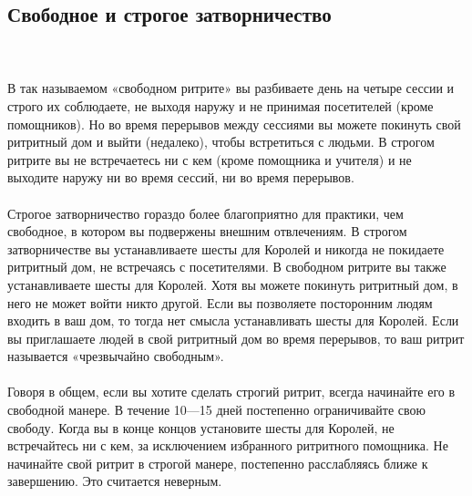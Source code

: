 \subsection{Свободное и строгое затворничество}
\\ \\ В так называемом «свободном ритрите» вы разбиваете день на четыре сессии и строго их соблюдаете, не выходя наружу и не принимая посетителей (кроме помощников). Но во время перерывов между сессиями вы можете покинуть свой ритритный дом и выйти (недалеко), чтобы встретиться с людьми. В строгом ритрите вы не встречаетесь ни с кем (кроме помощника и учителя) и не выходите наружу ни во время сессий, ни во время перерывов.
\\ \\ Строгое затворничество гораздо более благоприятно для практики, чем свободное, в котором вы подвержены внешним отвлечениям. В строгом затворничестве вы устанавливаете шесты для Королей и никогда не покидаете ритритный дом, не встречаясь с посетителями. В свободном ритрите вы также устанавливаете шесты для Королей. Хотя вы можете покинуть ритритный дом, в него не может войти никто другой. Если вы позволяете посторонним людям входить в ваш дом, то тогда нет смысла устанавливать шесты для Королей. Если вы приглашаете людей в свой ритритный дом во время перерывов, то ваш ритрит называется «чрезвычайно свободным».
\\ \\ Говоря в общем, если вы хотите сделать строгий ритрит, всегда начинайте его в свободной манере. В течение 10—15 дней постепенно ограничивайте свою свободу. Когда вы в конце концов установите шесты для Королей, не встречайтесь ни с кем, за исключением избранного ритритного помощника. Не начинайте свой ритрит в строгой манере, постепенно расслабляясь ближе к завершению. Это считается неверным.
